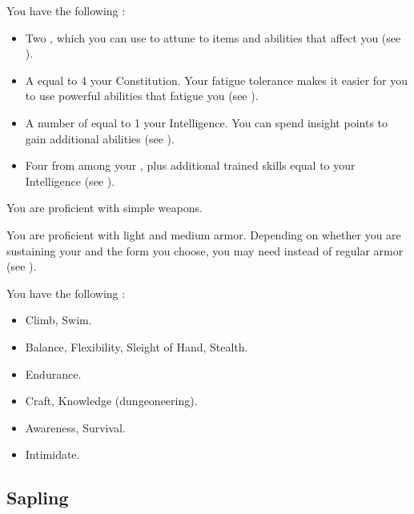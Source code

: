              You have the following :
            \begin{itemize}
                \item Two , which you can use to attune to items and abilities that affect you (see ).
                \item A  equal to 4 \add your Constitution.
                    Your fatigue tolerance makes it easier for you to use powerful abilities that fatigue you (see ).
                \item A number of  equal to 1 \add your Intelligence.
                    You can spend insight points to gain additional abilities (see ).
                \item Four  from among your , plus additional trained skills equal to your Intelligence (see ).
            \end{itemize}

            You are proficient with simple weapons.

            You are proficient with light and medium armor.
            Depending on whether you are sustaining your  and the form you choose, you may need  instead of regular armor (see ).

            You have the following :
            \begin{itemize}
                \item {} Climb, Swim.
                \item {} Balance, Flexibility, Sleight of Hand, Stealth.
                \item {} Endurance.
                \item {} Craft, Knowledge (dungeoneering).
                \item {} Awareness, Survival.
                \item {} Intimidate.
            \end{itemize}

    \subsection{Sapling}


